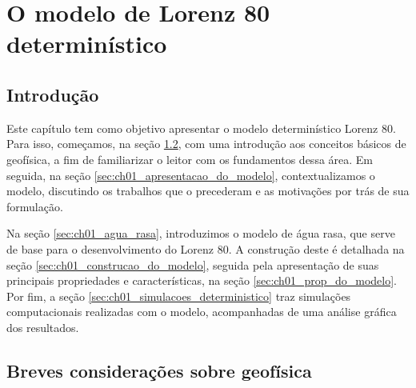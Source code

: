\chapter{O modelo de Lorenz 80 determinístico} \label{cap:ch01_lorenz_deterministico}

\section{Introdução} \label{sec:ch01_introducao}
Este capítulo tem como objetivo apresentar o modelo determinístico Lorenz 80. Para isso, começamos, na seção \ref{sec:ch01_geofisica}, com uma introdução aos conceitos básicos de geofísica, a fim de familiarizar o leitor com os fundamentos dessa área. Em seguida, na seção \ref{sec:ch01_apresentacao_do_modelo}, contextualizamos o modelo, discutindo os trabalhos que o precederam e as motivações por trás de sua formulação.

Na seção \ref{sec:ch01_agua_rasa}, introduzimos o modelo de água rasa, que serve de base para o desenvolvimento do Lorenz 80. A construção deste é detalhada na seção \ref{sec:ch01_construcao_do_modelo}, seguida pela apresentação de suas principais propriedades e características, na seção \ref{sec:ch01_prop_do_modelo}. Por fim, a seção \ref{sec:ch01_simulacoes_deterministico} traz simulações computacionais realizadas com o modelo, acompanhadas de uma análise gráfica dos resultados.

\section{Breves considerações sobre geofísica} \label{sec:ch01_geofisica}

